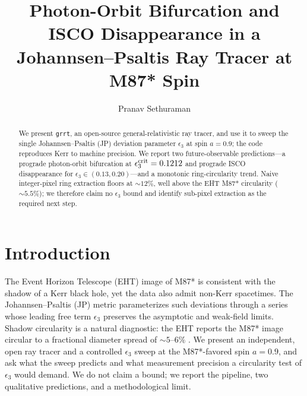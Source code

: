 \documentclass[RNAAS]{aastex631}
\begin{document}
\title{Photon-Orbit Bifurcation and ISCO Disappearance in a
Johannsen--Psaltis Ray Tracer at M87* Spin}

\author[0000-0000-0000-0000]{Pranav Sethuraman}

\begin{abstract}
We present \texttt{grrt}, an open-source general-relativistic ray tracer,
and use it to sweep the single Johannsen--Psaltis (JP) deviation parameter
$\epsilon_3$ at spin $a=0.9$; the code reproduces Kerr to machine
precision. We report two future-observable predictions---a prograde
photon-orbit bifurcation at $\epsilon_3^{\rm crit}=0.1212$ and prograde
ISCO disappearance for $\epsilon_3\in(0.13,0.20)$---and a monotonic
ring-circularity trend. Naive integer-pixel ring extraction floors at
$\sim\!12\%$, well above the EHT M87* circularity ($\sim\!5.5\%$); we
therefore claim no $\epsilon_3$ bound and identify sub-pixel extraction
as the required next step.
\end{abstract}

\section{Introduction}
The Event Horizon Telescope (EHT) image of M87* \citep{eht2019:paper-i}
is consistent with the shadow of a Kerr black hole, yet the data also
admit non-Kerr spacetimes. The Johannsen--Psaltis (JP) metric
\citep{johannsen:2011} parameterizes such deviations through a series
whose leading free term $\epsilon_3$ preserves the asymptotic and
weak-field limits. Shadow circularity is a natural diagnostic: the EHT
reports the M87* image circular to a fractional diameter spread of
$\sim\!5$--$6\%$ \citep[][\S7.4]{eht2019:paper-vi}. We present an
independent, open ray tracer and a controlled $\epsilon_3$ sweep at the
M87*-favored spin $a=0.9$, and ask what the sweep predicts and what
measurement precision a circularity test of $\epsilon_3$ would demand.
We do not claim a bound; we report the pipeline, two qualitative
predictions, and a methodological limit.
\end{document}
